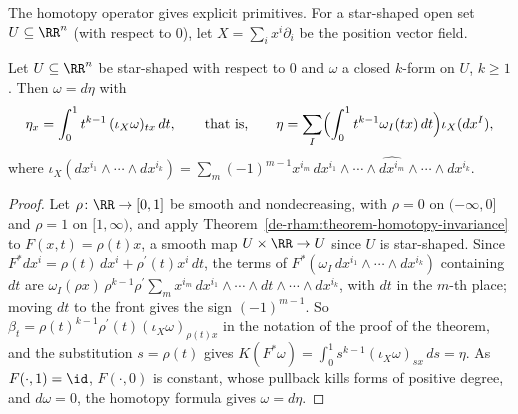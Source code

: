 The homotopy operator gives explicit primitives. For a star-shaped open set $U \subseteq \RR^n$ (with respect to $0$), let $X = \sum_ix^i\partial_i$ be the position vector
field.

\begin{corollary}\label{de-rham:corollary-explicit-poincare}
Let $U \subseteq \RR^n$ be star-shaped with respect to $0$ and $\omega$ a closed $k$-form on $U$, $k \geq 1$. Then $\omega = d\eta$ with
\[
\eta_x = \int_0^1t^{k-1}\,(\iota_X\omega)_{tx}\,dt, \qquad\text{that is,}\qquad \eta = \sum_I\Bigl(\int_0^1t^{k-1}\omega_I(tx)\,dt\Bigr)\iota_X(dx^I),
\]
where $\iota_X(dx^{i_1} \wedge \cdots \wedge dx^{i_k}) = \sum_m(-1)^{m-1}x^{i_m}\,dx^{i_1} \wedge \cdots \wedge \widehat{dx^{i_m}} \wedge \cdots \wedge dx^{i_k}$.
\end{corollary}

\begin{proof}
Let $\rho \colon \RR \to [0, 1]$ be smooth and nondecreasing, with $\rho = 0$ on $(-\infty, 0]$ and $\rho = 1$ on $[1, \infty)$, and apply
Theorem~\ref{de-rham:theorem-homotopy-invariance} to $F(x, t) = \rho(t)x$, a smooth map $U \times \RR \to U$ since $U$ is star-shaped. Since
$F^*dx^i = \rho(t)\,dx^i + \rho^{\prime}(t)x^i\,dt$, the terms of $F^*(\omega_I\,dx^{i_1} \wedge \cdots \wedge dx^{i_k})$ containing $dt$ are
$\omega_I(\rho x)\,\rho^{k-1}\rho^{\prime}\sum_m x^{i_m}\,dx^{i_1} \wedge \cdots \wedge dt \wedge \cdots \wedge dx^{i_k}$, with $dt$ in the $m$-th place; moving $dt$ to the front gives the sign
$(-1)^{m-1}$. So $\beta_t = \rho(t)^{k-1}\rho^{\prime}(t)(\iota_X\omega)_{\rho(t)x}$ in the notation of the proof of the theorem, and the substitution $s = \rho(t)$ gives
$K(F^*\omega) = \int_0^1s^{k-1}(\iota_X\omega)_{sx}\,ds = \eta$. As $F(\cdot, 1) = \id$, $F(\cdot, 0)$ is constant, whose pullback kills forms of positive degree, and $d\omega = 0$, the
homotopy formula gives $\omega = d\eta$.
\end{proof}

